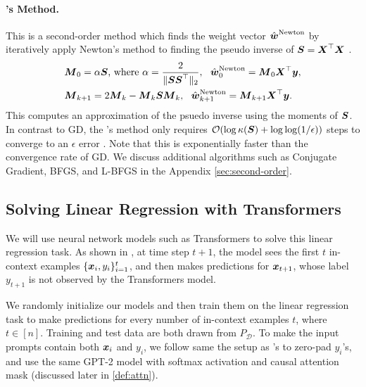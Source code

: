 \paragraph{\newton's Method.} This is a second-order method which finds the weight vector $ \hat{\boldsymbol{w}}^\mathrm{Newton}$ by iteratively apply Newton's method to finding the pseudo inverse of $\boldsymbol{S} = \boldsymbol{X}^\top \boldsymbol{X}$ \citep{schulz1933inverse,adi1965ai}. 
\begin{equation}
    \begin{aligned}
        &\boldsymbol{M}_0 = \alpha \boldsymbol{S} \textrm{, where } \alpha = \frac{2}{\|\boldsymbol{S} \boldsymbol{S}^\top\|_2 }, ~~ \hat{\boldsymbol{w}}^\mathrm{Newton}_0 = \boldsymbol{M}_0 \boldsymbol{X}^\top \boldsymbol{y}, \\
        & \boldsymbol{M}_{k+1} = 2 \boldsymbol{M}_{k} - \boldsymbol{M}_k \boldsymbol{S} \boldsymbol{M}_k, ~~ \hat{\boldsymbol{w}}^\mathrm{Newton}_{k+1} =  \boldsymbol{M}_{k+1}  \boldsymbol{X}^\top \boldsymbol{y}. 
    \end{aligned}
\end{equation}
This computes an approximation of the  psuedo inverse using the moments of $\boldsymbol{S}$. In contrast to GD, the \newton's method only requires $\mathcal O(\log \kappa(\boldsymbol{S}) + \log \log (1/\epsilon))$ steps to converge to an $\epsilon$ error \citep{soderstrom1974onp,Pan1991AnIN}. Note that this is exponentially faster than the convergence rate of GD. %
We discuss additional algorithms such as Conjugate Gradient, BFGS, and L-BFGS in the Appendix \ref{sec:second-order}.

\vspace{-1mm}
\subsection{Solving Linear Regression with Transformers}
\vspace{-1mm}

We will use neural network models such as Transformers to solve this linear regression task. As shown in , at time step $t+1$, the model sees the first $t$ in-context examples $\{\boldsymbol{x}_i,y_i\}_{i=1}^t$, and then makes predictions for $\boldsymbol{x}_{t+1}$, whose label $y_{t+1}$ is not observed by the Transformers model.

We randomly initialize our models and then train them on the linear regression task to make predictions for every number of in-context examples $t$, where $t\in [n]$. Training and test data are both drawn from $P_{\mathcal{D}}$. To make the input prompts contain both $\boldsymbol{x}_i$ and $y_i$,  we follow same the setup as \citet{Garg2022WhatCT}'s to zero-pad $y_i$'s, and use the same GPT-2 model \citep{radford2019language} with softmax activation and causal attention mask  (discussed later in \cref{def:attn}). 

